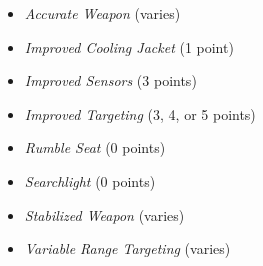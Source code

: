 
\begin{itemize}

  \item \emph{Accurate Weapon} (varies)

  \item \emph{Improved Cooling Jacket} (1 point)

  \item \emph{Improved Sensors} (3 points)

  \item \emph{Improved Targeting} (3, 4, or 5 points)

  \item \emph{Rumble Seat} (0 points)

  \item \emph{Searchlight} (0 points)

  \item \emph{Stabilized Weapon} (varies)

  \item \emph{Variable Range Targeting} (varies)

\end{itemize}

